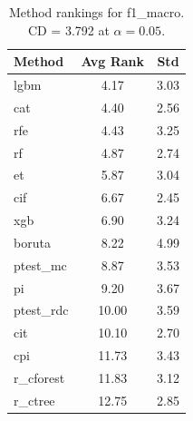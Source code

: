 \begin{table}[h]
\centering
\caption{Method rankings for f1_macro. CD = 3.792 at $\alpha=0.05$.}
\label{tab:ranks_f1_macro}
\begin{tabular}{lcc}
\toprule
Method & Avg Rank & Std \\
\midrule
lgbm & 4.17 & 3.03 \\
cat & 4.40 & 2.56 \\
rfe & 4.43 & 3.25 \\
rf & 4.87 & 2.74 \\
et & 5.87 & 3.04 \\
cif & 6.67 & 2.45 \\
xgb & 6.90 & 3.24 \\
boruta & 8.22 & 4.99 \\
ptest_mc & 8.87 & 3.53 \\
pi & 9.20 & 3.67 \\
ptest_rdc & 10.00 & 3.59 \\
cit & 10.10 & 2.70 \\
cpi & 11.73 & 3.43 \\
r_cforest & 11.83 & 3.12 \\
r_ctree & 12.75 & 2.85 \\
\bottomrule
\end{tabular}
\end{table}